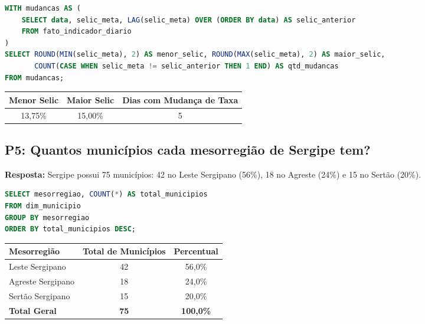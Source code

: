 \documentclass[11pt,a4paper]{article}
\begin{document}
\begin{lstlisting}[language=SQL]
WITH mudancas AS (
    SELECT data, selic_meta, LAG(selic_meta) OVER (ORDER BY data) AS selic_anterior
    FROM fato_indicador_diario
)
SELECT ROUND(MIN(selic_meta), 2) AS menor_selic, ROUND(MAX(selic_meta), 2) AS maior_selic,
       COUNT(CASE WHEN selic_meta != selic_anterior THEN 1 END) AS qtd_mudancas
FROM mudancas;
\end{lstlisting}

\begin{table}[h!]
\centering
\small
\begin{tabular}{ccc}
\toprule
\textbf{Menor Selic} & \textbf{Maior Selic} & \textbf{Dias com Mudança de Taxa} \\
\midrule
13,75\% & 15,00\% & 5 \\
\bottomrule
\end{tabular}
\end{table}

\subsection*{P5: Quantos municípios cada mesorregião de Sergipe tem?}
\noindent\textbf{Resposta:} Sergipe possui 75 municípios: 42 no Leste Sergipano (56\%), 18 no Agreste (24\%) e 15 no Sertão (20\%).

\begin{lstlisting}[language=SQL]
SELECT mesorregiao, COUNT(*) AS total_municipios
FROM dim_municipio
GROUP BY mesorregiao
ORDER BY total_municipios DESC;
\end{lstlisting}

\begin{table}[h!]
\centering
\small
\begin{tabular}{lcc}
\toprule
\textbf{Mesorregião} & \textbf{Total de Municípios} & \textbf{Percentual} \\
\midrule
Leste Sergipano & 42 & 56,0\% \\
Agreste Sergipano & 18 & 24,0\% \\
Sertão Sergipano & 15 & 20,0\% \\
\midrule
\textbf{Total Geral} & \textbf{75} & \textbf{100,0\%} \\
\bottomrule
\end{tabular}
\end{table}

\end{document}

